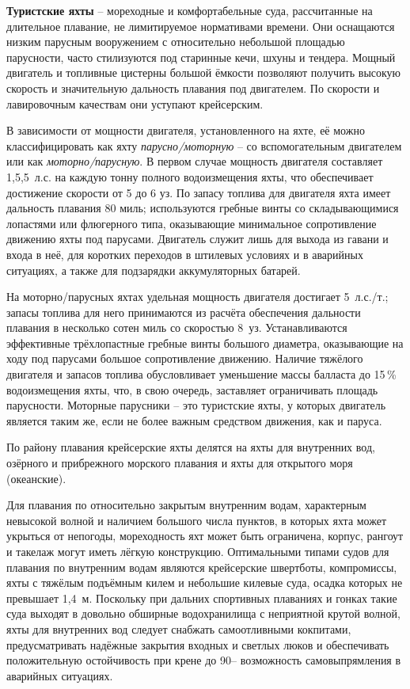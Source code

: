 \textbf{Туристские яхты} \--- мореходные и
комфортабельные суда, рассчитанные на длительное плавание, не
лимитируемое нормативами времени. Они оснащаются низким парусным
вооружением с относительно небольшой площадью парусности, часто
стилизуются под старинные кечи, шхуны и тендера. Мощный двигатель и
топливные цистерны большой ёмкости позволяют получить высокую скорость
и значительную дальность плавания под двигателем. По скорости и
лавировочным качествам они уступают крейсерским.

В зависимости от мощности двигателя, установленного на яхте, её можно
классифицировать как яхту
\textit{парусно\-/моторную} \--- со
вспомогательным двигателем или как
\textit{моторно\-/парусную}. В первом случае
мощность двигателя составляет 1,5,5~л.с. на каждую тонну
полного водоизмещения яхты, что обеспечивает достижение скорости от 5
до 6 уз. По запасу топлива для двигателя яхта имеет дальность плавания
80 миль; используются гребные винты со складывающимися
лопастями или флюгерного типа, оказывающие минимальное сопротивление
движению яхты под парусами. Двигатель служит лишь для выхода из гавани
и входа в неё, для коротких переходов в штилевых условиях и в
аварийных ситуациях, а также для подзарядки аккумуляторных батарей.

На моторно\-/парусных яхтах удельная мощность двигателя достигает
5~л.с./т.; запасы топлива для него принимаются из расчёта
обеспечения дальности плавания в несколько сотен миль со скоростью
8~уз. Устанавливаются эффективные трёхлопастные гребные винты
большого диаметра, оказывающие на ходу под парусами большое
сопротивление движению. Наличие тяжёлого двигателя и запасов топлива
обусловливает уменьшение массы балласта до 15\,\%
водоизмещения яхты, что, в свою очередь, заставляет ограничивать
площадь парусности. Моторные парусники \--- это туристские яхты, у
которых двигатель является таким же, если не более важным средством
движения, как и паруса.

По району плавания крейсерские яхты делятся на яхты для внутренних
вод, озёрного и прибрежного морского плавания и яхты для открытого
моря (океанские).

Для плавания по относительно закрытым внутренним водам, характерным
невысокой волной и наличием большого числа пунктов, в которых яхта
может укрыться от непогоды, мореходность яхт может быть ограничена,
корпус, рангоут и такелаж могут иметь лёгкую конструкцию. Оптимальными
типами судов для плавания по внутренним водам являются крейсерские
швертботы, компромиссы, яхты с тяжёлым подъёмным килем и небольшие
килевые суда, осадка которых не превышает 1,4~м. Поскольку при дальних
спортивных плаваниях и гонках такие суда выходят в довольно обширные
водохранилища с неприятной крутой волной, яхты для внутренних вод
следует снабжать самоотливными кокпитами, предусматривать надёжные
закрытия входных и светлых люков и обеспечивать положительную
остойчивость при крене до 90\gr \--- возможность самовыпрямления в
аварийных ситуациях.


